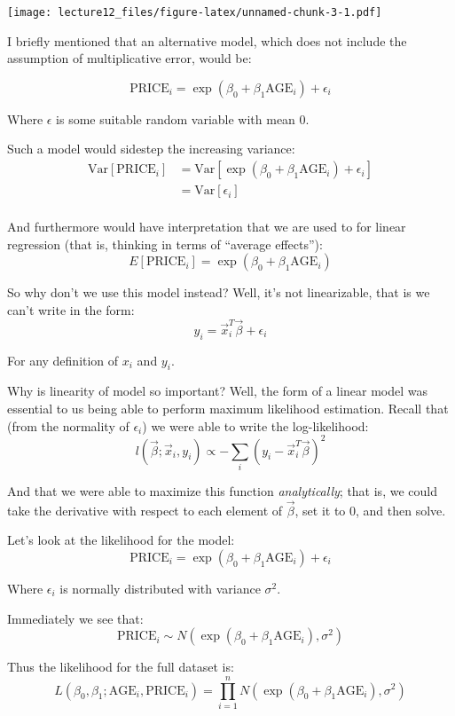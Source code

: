 \documentclass[
]{article}
\begin{document}
\texttt{[image: lecture12\_files/figure-latex/unnamed-chunk-3-1.pdf]}

I briefly mentioned that an alternative model, which does not include
the assumption of multiplicative error, would be:

\[
\text{PRICE}_i =\exp{(\beta_0 + \beta_1 \text{AGE}_i)} + \epsilon_i
\]

Where \(\epsilon\) is some suitable random variable with mean 0.

Such a model would sidestep the increasing variance: \[
\begin{split}
\text{Var}[\text{PRICE}_i] &= \text{Var}\left[ \exp{ \left( \beta_0 + \beta_1 \text{AGE}_i \right)} +\epsilon _i  \right]\\
&= \text{Var}\left[ \epsilon _i  \right]\\
\end{split}
\]

And furthermore would have interpretation that we are used to for linear
regression (that is, thinking in terms of ``average effects''): \[
E[\text{PRICE}_i] = \exp{ \left( \beta_0 + \beta_1 \text{AGE}_i \right) }
\]

So why don't we use this model instead? Well, it's not linearizable,
that is we can't write in the form: \[
y_i = \vec{x}_i^T \vec{\beta} + \epsilon_i
\]

For any definition of \(x_i\) and \(y_i\).

Why is linearity of model so important? Well, the form of a linear model
was essential to us being able to perform maximum likelihood estimation.
Recall that (from the normality of \(\epsilon_i\)) we were able to write
the log-likelihood: \[
l(\vec{\beta}; \vec{x}_i, y_i) \propto -\sum_i (y_i - \vec{x}_i^T \vec{\beta})^2
\]

And that we were able to maximize this function \emph{analytically};
that is, we could take the derivative with respect to each element of
\(\vec{\beta}\), set it to 0, and then solve.

Let's look at the likelihood for the model: \[
\text{PRICE}_i = \exp{\left(\beta_0 + \beta_1 \text{AGE}_i\right)} + \epsilon_i
\]

Where \(\epsilon_i\) is normally distributed with variance \(\sigma^2\).

Immediately we see that: \[
\text{PRICE}_i \sim N(\exp{\left(\beta_0 + \beta_1 \text{AGE}_i\right)}, \sigma^2)
\]

Thus the likelihood for the full dataset is: \[
L(\beta_0, \beta_1; \text{AGE}_i, \text{PRICE}_i) = \prod\limits_{i=1}^n  N(\exp{\left(\beta_0 + \beta_1 \text{AGE}_i\right)}, \sigma^2)
\]
\end{document}
